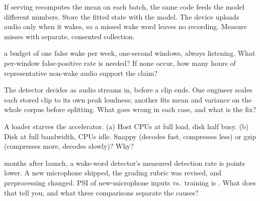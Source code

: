 \documentclass{studysheet}
\begin{document}
\begin{rightcol}
%
  {If serving recomputes the mean on each batch, the same code feeds the model different numbers.
   Store the fitted state with the model.}{}
%
  {The device uploads audio only when it wakes, so a missed wake word leaves no recording.
   Measure misses with separate, consented collection.}{}

\begin{qs}
\item \assumed{} a budget of one false wake per week, one-second windows, always listening. What
  per-window false-positive rate is needed? If none occur, how many hours of representative
  non-wake audio support the claim?
\item The detector decides as audio streams in, before a clip ends. One engineer scales each stored clip to its own peak loudness; another fits mean and variance on
  the whole corpus before splitting. What goes wrong in each case, and what is the fix?
\item A loader starves the accelerator. (a) Host CPUs at full load, disk half busy. (b) Disk at full
  bandwidth, CPUs idle. Snappy (decodes fast, compresses less) or gzip (compresses more, decodes
  slowly)? Why?
\item {} months after launch, a wake-word detector's measured detection rate is 
  points lower. A new microphone shipped, the grading rubric was revised, and preprocessing changed.
  \assumed{} PSI of new-microphone inputs vs.\ training is . What does that tell you, and what three
  comparisons separate the causes?
\end{qs}
\end{rightcol}
\end{document}
